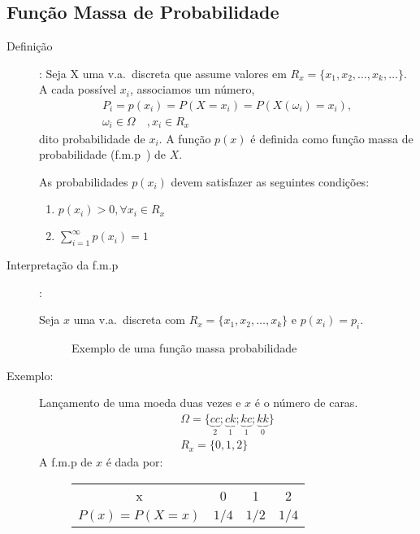    \subsection{Função Massa de Probabilidade} 
   \begin{description}
     \item [Definição]: Seja X uma v.a.\ discreta que assume valores em $R_{x}=\{x_1,x_2,\dots,
       x_{k},\dots\}$. A cada possível $x_{i}$, associamos um número, 
       \begin{align*}
         P_{i}=p({x_i})=P(X={x_i})=P(X( \omega_i)=x_i),\\
         \omega_{i} \in \Omega \quad , x_{i} \in R_{x} \nonumber
       \end{align*}
       dito probabilidade de $x_{i}$. A função $p(x)$ é definida como função massa de probabilidade 
       (f.m.p\ ) de $X$. 

       As probabilidades $p(x_i)$ devem satisfazer as seguintes condições: 
       \begin{enumerate}[label=(\roman*)]
         \item $p(x_i)>0, \forall x_i \in R_{x}$

         \item $\sum^\infty_{i=1} p(x_i)=1$
       \end{enumerate}
     \item [Interpretação da f.m.p\ ]: 

       Seja $x$ uma v.a.\ discreta com $R_{x}= \{x_1,x_2,\dots,x_k \}$ e $p(x_i)=p_i$.
       \begin{figure}[H]
         \centering
         
         \caption{Exemplo de uma função massa probabilidade}
         \label{fig:24}
       \end{figure}

     \item [Exemplo:] Lançamento de uma moeda duas vezes e $x$ é o número de caras.
       \begin{align*}
         \Omega = \{ \underbrace{cc}_{2}; \underbrace{ck}_{1};\underbrace{kc}_{1};\underbrace{kk}_{0} \} \\
         R_{x}= \{0,1,2\}
       \end{align*}
       A f.m.p de $x$ é dada por: 
       \begin{figure} [H]
         \centering
         \begin{tabular}{ c c c c}
           \toprule
           x &0&1&2 \\ \cmidrule{1-4}
           $P(x)=P(X=x)$&$1/4$&$1/2$& $1/4$\\    \bottomrule
         \end{tabular}
         \label{tab:4}
       \end{figure}



\end{description}
